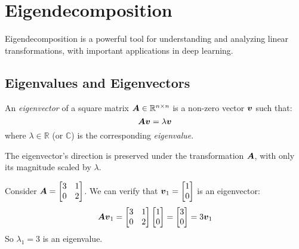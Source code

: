 
\section{Eigendecomposition}
\label{sec:eigendecomposition}

Eigendecomposition is a powerful tool for understanding and analyzing linear transformations, with important applications in deep learning.

\subsection{Eigenvalues and Eigenvectors}

\begin{definition}
An \emph{eigenvector} of a square matrix $\boldsymbol{A} \in \mathbb{R}^{n \times n}$ is a non-zero vector $\boldsymbol{v}$ such that:
\begin{equation}
    \boldsymbol{A}\boldsymbol{v} = \lambda\boldsymbol{v}
\end{equation}
where $\lambda \in \mathbb{R}$ (or $\mathbb{C}$) is the corresponding \emph{eigenvalue}.
\end{definition}

The eigenvector's direction is preserved under the transformation $\boldsymbol{A}$, with only its magnitude scaled by $\lambda$.

\begin{example}
Consider $\boldsymbol{A} = \begin{bmatrix} 3 & 1 \\ 0 & 2 \end{bmatrix}$. We can verify that $\boldsymbol{v}_1 = \begin{bmatrix} 1 \\ 0 \end{bmatrix}$ is an eigenvector:
\begin{equation}
    \boldsymbol{A}\boldsymbol{v}_1 = \begin{bmatrix} 3 & 1 \\ 0 & 2 \end{bmatrix}\begin{bmatrix} 1 \\ 0 \end{bmatrix} = \begin{bmatrix} 3 \\ 0 \end{bmatrix} = 3\boldsymbol{v}_1
\end{equation}
So $\lambda_1 = 3$ is an eigenvalue.
\end{example}

